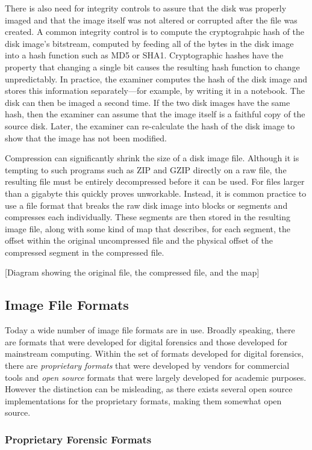 \documentclass[11pt,letter]{article}
\begin{document}
There is also need for integrity controls to assure that the disk was
properly imaged and that the image itself was not altered or corrupted
after the file was created. A common integrity control is to compute
the cryptograhpic hash of the disk image's bitstream, computed by
feeding all of the bytes in the disk image into a hash function such
as MD5 or SHA1. Cryptographic hashes have the property that changing a
single bit causes the resulting hash function to change
unpredictably. In practice, the examiner computes the hash of the disk
image and stores this information separately---for example, by writing
it in a notebook. The disk can then be imaged a second time. If the
two disk images have the same hash, then the examiner can assume that
the image itself is a faithful copy of the source disk. Later, the
examiner can re-calculate the hash of the disk image to show that the
image has not been modified.

Compression can significantly shrink the size of a disk image
file. Although it is tempting to such programs such as ZIP and GZIP
directly on a raw file, the resulting file must be entirely
decompressed before it can be used. For files larger than a gigabyte
this quickly proves unworkable. Instead, it is common practice to
use a file format that breaks the raw disk image into blocks or
segments and compresses each individually. These segments are then
stored in the resulting image file, along with some kind of map that
describes, for each segment, the offset within the original uncompressed file
and the physical offset of the compressed segment in the compressed file.

[Diagram showing the original file, the compressed file, and the map]

\subsection{Image File Formats}
Today a wide number of image file formats are in use. Broadly
speaking, there are formats that were developed for digital forensics
and those developed for mainstream computing. Within the set of
formats developed for digital forensics, there are \emph{proprietary formats} that were developed by
vendors for commercial tools and \emph{open source} formats that were
largely developed for academic purposes. However the distinction can
be misleading, as there exists several open source implementations for
the proprietary formats, making them somewhat open source. 

\subsubsection{Proprietary Forensic Formats}
\end{document}
